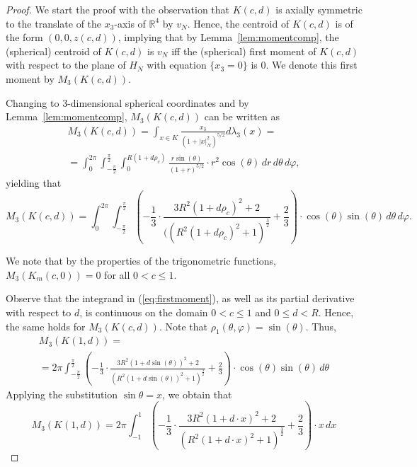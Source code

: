 \documentclass[twoside]{amsart}
\theoremstyle{plain}
\theoremstyle{definition}
\numberwithin{equation}{section}
\renewcommand{\Re}{\mathbb R}
\begin{document}
\begin{proof}
We start the proof with the observation that $K(c,d)$ is axially symmetric to the translate of the $x_3$-axis of $\Re^4$ by $v_N$. Hence, the centroid of $K(c,d)$ is of the form $(0,0,z(c,d))$, implying that by Lemma~\ref{lem:momentcomp}, the (spherical) centroid of $K(c,d)$ is $v_N$ iff the (spherical) first moment of $K(c,d)$ with respect to the plane of $H_N$ with equation $\{ x_3 = 0 \}$ is $0$. We denote this first moment by $M_3(K(c,d))$.

Changing to $3$-dimensional spherical coordinates and by Lemma~\ref{lem:momentcomp}, $M_3(K(c,d))$ can be written as
\begin{multline*}
M_3(K(c,d)) = \int_{x \in K} \frac{x_3}{\left( 1+ |x|_N^2 \right)^{5/2}} d \lambda_3(x) =\\
= 
\int_{0}^{2\pi}\int_{-\frac{\pi}{2}}^{\frac{\pi}{2}}\int_{0}^{R(1+d\rho_c)} \frac{r\sin(\theta)}{(1+r)^{5/2}}\cdot r^2\cos(\theta) \,dr\,d\theta\,d\varphi,
\end{multline*}
yielding that
\begin{equation}\label{eq:firstmoment}
M_3(K(c,d)) = \int_{0}^{2\pi}\int_{-\frac{\pi}{2}}^{\frac{\pi}{2}}\left(-\frac{1}{3}\cdot\frac{3R^2(1+d\rho_c)^2+2}{((R^2(1+d\rho_c)^2+1)^\frac{3}{2}}+\frac{2}{3}\right)\cdot\cos(\theta)\sin(\theta)\,d\theta\,d\varphi .
\end{equation}

We note that by the properties of the trigonometric functions, $M_3(K_m(c,0))=0$ for all $0 < c \leq 1$.

Observe that the integrand in (\ref{eq:firstmoment}), as well as its partial derivative with respect to $d$, is continuous on the domain $0 < c \leq 1$ and $0 \leq d < R$. Hence, the same holds for $M_3(K(c,d))$.
Note that $\rho_1(\theta, \varphi) = \sin(\theta)$. Thus,
\begin{multline*}
M_3(K(1,d)) =\\
=2\pi\int_{-\frac{\pi}{2}}^{\frac{\pi}{2}}\left(-\frac{1}{3}\cdot\frac{3R^2(1+d\sin(\theta))^2+2}{(R^2(1+d\sin(\theta))^2+1)^\frac{3}{2}}+\frac{2}{3}\right)\cdot\cos(\theta)\sin(\theta)\,d\theta
\end{multline*}
Applying the substitution $\sin \theta = x$, we obtain that
\begin{equation}\label{eq:firstmomentc1_2}
M_3(K(1,d)) = 2\pi\int_{-1}^{1}\left(-\frac{1}{3}\cdot\frac{3R^2(1+d\cdot x)^2+2}{(R^2(1+d\cdot x)^2+1)^\frac{3}{2}}+\frac{2}{3}\right)\cdot x\,dx
\end{equation}


\end{proof}
\end{document}
